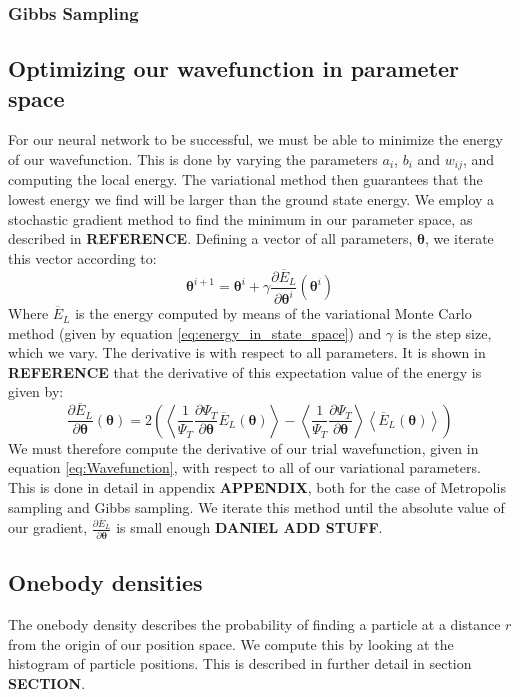 \documentclass[a4paper, 10pt]{article}
\begin{document}
	\subsubsection{Gibbs Sampling}
	\subsection{Optimizing our wavefunction in parameter space}
	For our neural network to be successful, we must be able to minimize the energy of our wavefunction. This is done by varying the parameters $a_i$, $b_i$ and $w_{ij}$, and computing the local energy. The variational method then guarantees that the lowest energy we find will be larger than the ground state energy. We employ a stochastic gradient method to find the minimum in our parameter space, as described in \textbf{REFERENCE}. Defining a vector of all parameters, $\boldsymbol{\theta}$, we iterate this vector according to:
	\begin{equation}\label{eq:Minimization_theory}
	\boldsymbol{\theta}^{i+1}=\boldsymbol{\theta}^i + \gamma \frac{\partial \overline{E}_L}{\partial \boldsymbol{\theta}^i}(\boldsymbol{\theta}^i)
	\end{equation}
	Where $\overline{E}_L$ is the energy computed by means of the variational Monte Carlo method (given by equation \ref{eq:energy_in_state_space}) and $\gamma$ is the step size, which we vary. The derivative is with respect to all parameters. It is shown in \textbf{REFERENCE} that the derivative of this expectation value of the energy is given by:
	\begin{equation}
	\frac{\partial \overline{E}_L}{\partial \boldsymbol{\theta}}(\boldsymbol{\theta})=2\left(\left\langle \frac{1}{\Psi_T}\frac{\partial \Psi_T}{\partial \boldsymbol{\theta}}\overline{E}_L(\boldsymbol{\theta})\right\rangle-\left\langle \frac{1}{\Psi_T}\frac{\partial \Psi_T}{\partial \boldsymbol{\theta}}\right\rangle\left\langle \overline{E}_L(\boldsymbol{\theta})\right\rangle\right)
	\end{equation}
	We must therefore compute the derivative of our trial wavefunction, given in equation \ref{eq:Wavefunction}, with respect to all of our variational parameters.
	This is done in detail in appendix \textbf{APPENDIX}, both for the case of Metropolis sampling and Gibbs sampling. We iterate this method until the absolute value of our gradient, $\frac{\partial \overline{E}_L}{\partial \boldsymbol{\theta}}$  is small enough \textbf{DANIEL ADD STUFF}.
	\subsection{Onebody densities}
	The onebody density describes the probability of finding a particle at a distance $r$ from the origin of our position space.	We compute this by looking at the histogram of particle positions. This is described in further detail in section \textbf{SECTION}.
	
\end{document}
